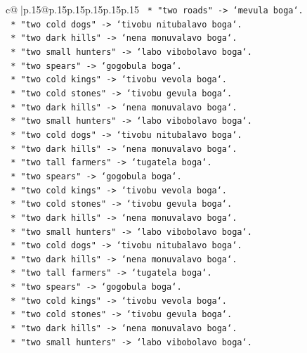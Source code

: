\documentclass{article}
\begin{document}
{\begin{supertabular}{c@{$\;$}|p{.15\linewidth}@{}p{.15\linewidth}p{.15\linewidth}p{.15\linewidth}p{.15\linewidth}p{.15\linewidth}}
{{{\texttt{        *   "two roads" {-}> `mevula boga`.} \\
\texttt{        *   "two cold dogs" {-}> `tivobu nitubalavo boga`.} \\
\texttt{        *   "two dark hills" {-}> `nena monuvalavo boga`.} \\
\texttt{        *   "two small hunters" {-}> `labo vibobolavo boga`.} \\
\texttt{        *   "two spears" {-}> `gogobula boga`.} \\
\texttt{        *   "two cold kings" {-}> `tivobu vevola boga`.} \\
\texttt{        *   "two cold stones" {-}> `tivobu gevula boga`.} \\
\texttt{        *   "two dark hills" {-}> `nena monuvalavo boga`.} \\
\texttt{        *   "two small hunters" {-}> `labo vibobolavo boga`.} \\
\texttt{        *   "two cold dogs" {-}> `tivobu nitubalavo boga`.} \\
\texttt{        *   "two dark hills" {-}> `nena monuvalavo boga`.} \\
\texttt{        *   "two tall farmers" {-}> `tugatela boga`.} \\
\texttt{        *   "two spears" {-}> `gogobula boga`.} \\
\texttt{        *   "two cold kings" {-}> `tivobu vevola boga`.} \\
\texttt{        *   "two cold stones" {-}> `tivobu gevula boga`.} \\
\texttt{        *   "two dark hills" {-}> `nena monuvalavo boga`.} \\
\texttt{        *   "two small hunters" {-}> `labo vibobolavo boga`.} \\
\texttt{        *   "two cold dogs" {-}> `tivobu nitubalavo boga`.} \\
\texttt{        *   "two dark hills" {-}> `nena monuvalavo boga`.} \\
\texttt{        *   "two tall farmers" {-}> `tugatela boga`.} \\
\texttt{        *   "two spears" {-}> `gogobula boga`.} \\
\texttt{        *   "two cold kings" {-}> `tivobu vevola boga`.} \\
\texttt{        *   "two cold stones" {-}> `tivobu gevula boga`.} \\
\texttt{        *   "two dark hills" {-}> `nena monuvalavo boga`.} \\
\texttt{        *   "two small hunters" {-}> `labo vibobolavo boga`.} \\
}}}
\end{supertabular}}
\end{document}
